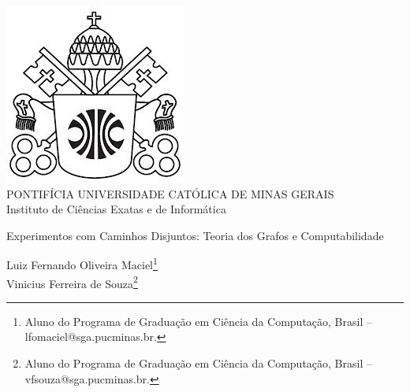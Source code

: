 \documentclass[a4paper,12pt,Times]{article}
\makeatletter
\newcommand{\monog}{Experimentos com Caminhos Disjuntos: Teoria dos Grafos e Computabilidade}
\newcommand{\origem}{Brasil }
\newcommand{\AutorA}{Luiz Fernando Oliveira Maciel}
\newcommand{\funcaoA}{}
\newcommand{\emailA}{lfomaciel@sga.pucminas.br}
\newcommand{\cursA}{Aluno do Programa de Graduação em Ciência da Computação}
\newcommand{\AutorB}{Vinicius Ferreira de Souza}
\newcommand{\funcaoB}{}
\newcommand{\emailB}{vfsouza@sga.pucminas.br}
\newcommand{\cursB}{Aluno do Programa de Graduação em Ciência da Computação}
\newcommand{\keyword}[1]{\textsf{#1}}
\makeatother
\begin{document}

\begin{center}
\includegraphics[scale=0.2]{figuras/brasao.jpg} \\
PONTIFÍCIA UNIVERSIDADE CATÓLICA DE MINAS GERAIS \\
Instituto de Ciências Exatas e de Informática


\end{center}

 \vspace{0cm} {
 \singlespacing \Large{\monog}
 }

\vspace{1.0cm}

\begin{flushright}
\singlespacing 
\normalsize{\AutorA \footnote{\funcaoA \cursA, \origem -- \emailA . }} \\
\normalsize{\AutorB \footnote{\funcaoB \cursB, \origem -- \emailB . }} \\
\end{flushright}
\thispagestyle{empty}

\vspace{1.0cm}

\begin{abstract}
\noindent
Este artigo tem como objetivo apresentar o algoritmo desenvolvido para encontrar caminhos disjuntos em grafos e analisar o comportamento desse algoritmo em diferentes tipos de grafos.
Artigo feito como parte do Trabalho Prático 2 da matéria Teoria dos Grafos e Computabilidade, do 4º período do curso de Ciência da Computação da PUC Minas PPL.
\\\textbf{\keyword{Palavras-chave: }} Teoria dos Grafos e Computabilidade. Caminhos Disjuntos.
\end{abstract}
\end{document}
